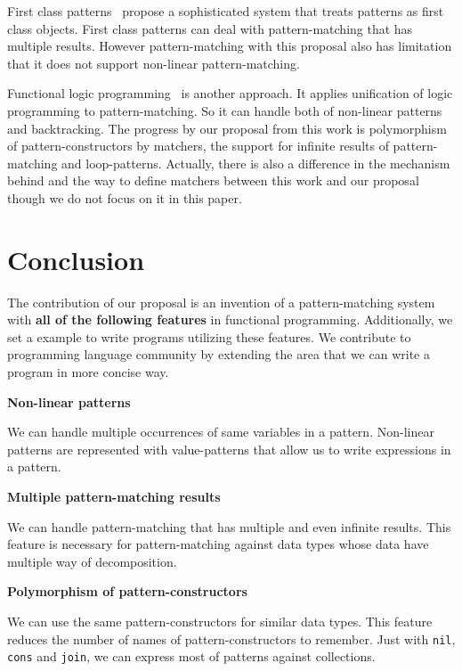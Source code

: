 \documentclass{article}
\begin{document}
\begin{multicols}{2}
First class patterns~\cite{tullsen2000first} propose a sophisticated system that treats patterns as first class objects.
First class patterns can deal with pattern-matching that has multiple results.
However pattern-matching with this proposal also has limitation that it does not support non-linear pattern-matching.

Functional logic programming~\cite{AntoyHanus05LOPSTR} is another approach.
It applies unification of logic programming to pattern-matching.
So it can handle both of non-linear patterns and backtracking.
The progress by our proposal from this work is polymorphism of pattern-constructors by matchers, the support for infinite results of pattern-matching and loop-patterns.
Actually, there is also a difference in the mechanism behind and the way to define matchers between this work and our proposal though we do not focus on it in this paper.

\section{Conclusion}\label{conclusion}

The contribution of our proposal is an invention of a pattern-matching system with \textbf{all of the following features} in functional programming.
Additionally, we set a example to write programs utilizing these features.
We contribute to programming language community by extending the area that we can write a program in more concise way.

\begin{description}
  \item \textbf{Non-linear patterns}

    We can handle multiple occurrences of same variables in a pattern.
    Non-linear patterns are represented with value-patterns that allow us to write expressions in a pattern.

  \item \textbf{Multiple pattern-matching results}

    We can handle pattern-matching that has multiple and even infinite results.
    This feature is necessary for pattern-matching against data types whose data have multiple way of decomposition.

  \item \textbf{Polymorphism of pattern-constructors}

    We can use the same pattern-constructors for similar data types.
    This feature reduces the number of names of pattern-constructors to remember.
    Just with \texttt{nil}, \texttt{cons} and \texttt{join}, we can express most of patterns against collections.


\end{description}
\end{multicols}
\end{document}
